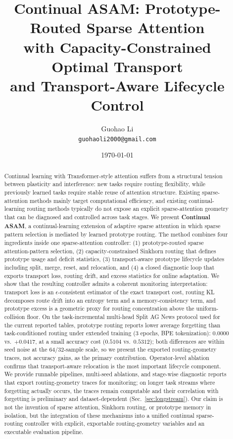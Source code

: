 \documentclass[11pt,a4paper]{article}
\title{\textbf{Continual ASAM: Prototype-Routed Sparse Attention\\with Capacity-Constrained Optimal Transport\\and Transport-Aware Lifecycle Control}}
\author{Guohao Li\\
\texttt{guohaoli2000@gmail.com}}
\date{\today}
\theoremstyle{definition}
\begin{document}
\maketitle

\begin{abstract}
Continual learning with Transformer-style attention suffers from a structural tension between plasticity and interference: new tasks require routing flexibility, while previously learned tasks require stable reuse of attention structure. Existing sparse-attention methods mainly target computational efficiency, and existing continual-learning routing methods typically do not expose an explicit sparse-attention geometry that can be diagnosed and controlled across task stages. We present \textbf{Continual ASAM}, a continual-learning extension of adaptive sparse attention in which sparse pattern selection is mediated by learned prototype routing. The method combines four ingredients inside one sparse-attention controller: (1) prototype-routed sparse attention-pattern selection, (2) capacity-constrained Sinkhorn routing that defines prototype usage and deficit statistics, (3) transport-aware prototype lifecycle updates including split, merge, reset, and relocation, and (4) a closed diagnostic loop that exports transport loss, routing drift, and excess statistics for online adaptation. We show that the resulting controller admits a coherent monitoring interpretation: transport loss is an $\epsilon$-consistent estimator of the exact transport cost, routing KL decomposes route drift into an entropy term and a memory-consistency term, and prototype excess is a geometric proxy for routing concentration above the uniform-collision floor. On the task-incremental multi-head Split AG News protocol used for the current reported tables, prototype routing reports lower average forgetting than task-conditioned routing under extended training (3 epochs, BPE tokenization): $0.0000$ vs.\ $+0.0417$, at a small accuracy cost ($0.5104$ vs.\ $0.5312$); both differences are within seed noise at the 64/32-sample scale, so we present the exported routing-geometry traces, not accuracy gains, as the primary contribution. Operator-level ablation confirms that transport-aware relocation is the most important lifecycle component. We provide runnable pipelines, multi-seed ablations, and stage-wise diagnostic reports that export routing-geometry traces for monitoring; on longer task streams where forgetting actually occurs, the traces remain computable and their correlation with forgetting is preliminary and dataset-dependent (Sec.~\ref{sec:longstream}). Our claim is not the invention of sparse attention, Sinkhorn routing, or prototype memory in isolation, but the integration of these mechanisms into a unified continual sparse-routing controller with explicit, exportable routing-geometry variables and an executable evaluation pipeline.
\end{abstract}
\end{document}
